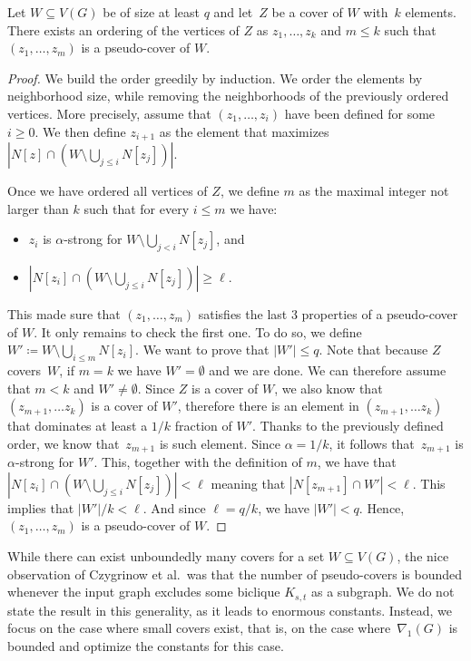 \begin{lemma}\label{lem:cover-to-pseudo-cover}
Let $W\subseteq V(G)$ be of size at least
$q$ and let~$Z$ be a cover of $W$ with~$k$ elements.
There exists an ordering of the vertices of $Z$ as $z_1,\ldots, z_k$
and $m\leq k$ such that $(z_1,\ldots, z_m)$ is a pseudo-cover of $W$.
\end{lemma}
\begin{proof}
 We build the order greedily by induction. We order the elements by neighborhood size, while removing the neighborhoods of the previously ordered vertices. More precisely, assume that $(z_1,\ldots,z_i)$ have been defined for \mbox{some~$i\ge 0$}. We then define $z_{i+1}$ as the element that maximizes $|N[z] \cap (W \setminus \bigcup_{j\le i}N[z_j])|$.

 Once we have ordered all vertices of $Z$, we define $m$ as the maximal integer not larger than $k$ such that for every $i \le m$ we have:
 \begin{itemize}
   \item $z_i$ is $\alpha$-strong for $W\setminus\bigcup_{j<i}N[z_j]$, and
   \item $|N[z_i] \cap (W \setminus \bigcup_{j\le i}N[z_j])| \ge \ell$.
 \end{itemize}

This made sure that $(z_1,\ldots, z_m)$ satisfies the last 3 properties of a
 pseudo-cover of $W$. It only remains to check the first one.
 To do so, we define $W' \coloneq W \setminus\bigcup_{i\le m}N[z_i]$. We want to prove
 that $|W'| \le q$. Note that because $Z$ covers~$W$, if $m=k$ we
 have $W'=\emptyset$ and we are done. We can therefore assume
 that $m<k$ and $W'\neq \emptyset$. Since $Z$ is a cover of $W$,
 we also know that $(z_{m+1},\ldots z_k)$ is a cover of $W'$,
 therefore there is an element in $(z_{m+1},\ldots z_k)$ that
 dominates at least a $1 / k$ fraction of $W'$. Thanks to the
 previously defined order, we know that~$z_{m+1}$ is such element.
 Since $\alpha = 1/k$, it follows that~$z_{m+1}$ is $\alpha$-strong
 for $W'$.
 This, together with the definition of $m$, we have that $|N[z_i] \cap (W \setminus \bigcup_{j\le i}N[z_j])| < \ell$ meaning that $|N[z_{m+1}] \cap W'| < \ell$. This implies that $|W'|/k < \ell$. And since $\ell = q/k$, we have $|W'|<q$.
%
  Hence, $(z_1,\ldots, z_m)$ is a pseudo-cover of $W$.
\end{proof}


While there can exist unboundedly many covers for a set $W\subseteq V(G)$,
the nice observation of Czygrinow et al.\ was that the number of
pseudo-covers is bounded whenever the input graph excludes some
biclique $K_{s,t}$ as a subgraph. We do not state the result in this
generality, as it leads to enormous constants. Instead, we focus on the
case where small covers exist, that is, on the case where~$\nabla_1(G)$
is bounded and optimize the constants for this case.


